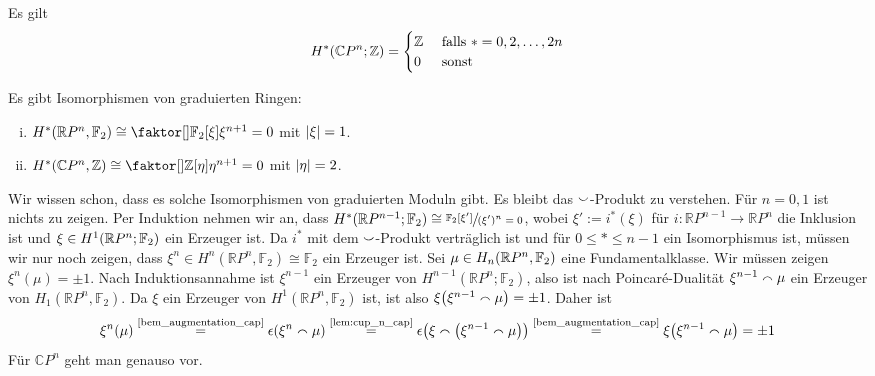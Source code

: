 \begin{beispiel}[{name=[Kohomologie des komplex projektiven Raumes]}]
	Es gilt
	\[
		H^* \enbrace*{\mathbb{C}P^n;\mathbb{Z}} = \begin{cases}
			\mathbb{Z} &\text{ falls }*=0,2,\ldots ,2n\\
			0 &\text{ sonst}
		\end{cases}
	\]
\end{beispiel}

\begin{satz}[{name=[Ringstruktur der Kohomologie für die projektiven Räume]}]
	Es gibt Isomorphismen von graduierten Ringen: 
	\begin{enumerate}[(i)]
		\item $H^* \enbrace*{\mathbb{R}P^n,\mathbb{F}_2} \cong \Faktor{\mathbb{F}_2[\xi]}{\xi^{n+1}=0}$ mit $\abs*{\xi}=1$.
		\item $H^* \enbrace*{\mathbb{C}P^n,\mathbb{Z}} \cong \Faktor{\mathbb{Z}[\eta]}{\eta^{n+1}=0}$ mit $\abs{\eta}=2$.
	\end{enumerate}
\end{satz}
\begin{beweis}
	Wir wissen schon, dass es solche Isomorphismen von graduierten Moduln gibt. 
	Es bleibt das $\cupp$-Produkt zu verstehen. Für $n=0,1$ ist nichts zu zeigen. 
	Per Induktion nehmen wir an, dass $H^*(\mathbb{R}P^{n-1};\mathbb{F}_2) \cong \sfrac{\mathbb{F}_2[\xi']}{(\xi')^n=0}$, wobei $\xi' := i^*(\xi)$ für $i \colon \mathbb{R}P^{n-1} \to \mathbb{R}P^n$ die Inklusion ist und $\xi \in H^1 \enbrace*{\mathbb{R}P^n;\mathbb{F}_2}$ ein Erzeuger ist.
	Da $i^*$ mit dem $\cupp$-Produkt verträglich ist und für $0 \le * \le {n-1}$ ein Isomorphismus ist, müssen wir nur noch zeigen, dass $\xi^n\in H^n(\mathbb{R}P^n,\mathbb{F}_2) \cong \mathbb{F}_2$ ein Erzeuger ist.
	Sei $\mu \in H_n \enbrace*{\mathbb{R}P^n,\mathbb{F}_2}$ eine Fundamentalklasse. Wir müssen zeigen $\xi^n(\mu)=  \pm 1$.
	Nach Induktionsannahme ist $\xi^{n-1}$ ein Erzeuger von $H^{n-1}(\mathbb{R}P^n;\mathbb{F}_2)$, also ist nach Poincaré-Dualität $\xi^{n-1} \capp \mu$ ein Erzeuger von $H_1(\mathbb{R}P^n,\mathbb{F}_2)$. 
	Da $\xi$ ein Erzeuger von $H^1(\mathbb{R}P^n,\mathbb{F}_2)$ ist, ist also $\xi \enbrace*{\xi^{n-1} \capp \mu} = \pm 1$. 
	Daher ist 
	\[
		\xi^n(\mu) \StackText{\ref{bem_augmentation_cap}}{=} \epsilon \enbrace*{\xi^n \capp \mu} \StackText{\ref{lem:cup_n_cap}}{=} \epsilon \enbrace*{ \xi \capp \enbrace*{\xi^{n-1} \capp \mu}} \StackText{\ref{bem_augmentation_cap}}{=} \xi \enbrace*{\xi^{n-1} \capp \mu} = \pm 1
	\]
	Für $\mathbb{C}P^n$ geht man genauso vor.
\end{beweis}

